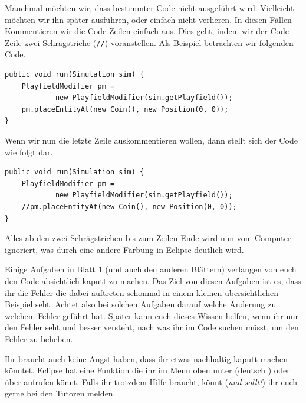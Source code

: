 \begin{Infobox}
    Manchmal möchten wir, dass bestimmter Code nicht ausgeführt wird. Vielleicht möchten wir ihn später ausführen, oder einfach nicht verlieren.
    In diesen Fällen Kommentieren wir die Code-Zeilen einfach aus.
    Dies geht, indem wir der Code-Zeile zwei Schrägstriche (\lstinline{//}) voranstellen.
    Als Beispiel betrachten wir folgenden Code.\\

    \hfill
    \begin{minipage}{.96\textwidth}
        \begin{lstlisting}
public void run(Simulation sim) {
    PlayfieldModifier pm =
            new PlayfieldModifier(sim.getPlayfield());
    pm.placeEntityAt(new Coin(), new Position(0, 0));
}
        \end{lstlisting}
    \end{minipage}

    Wenn wir nun die letzte Zeile auskommentieren wollen, dann stellt sich der Code wie folgt dar.\\

    \hfill
    \begin{minipage}{.96\textwidth}
        \begin{lstlisting}
public void run(Simulation sim) {
    PlayfieldModifier pm =
            new PlayfieldModifier(sim.getPlayfield());
    //pm.placeEntityAt(new Coin(), new Position(0, 0));
}
        \end{lstlisting}
    \end{minipage}

    Alles ab den zwei Schrägstrichen bis zum Zeilen Ende wird nun vom Computer ignoriert, was durch eine andere Färbung in Eclipse deutlich wird.
\end{Infobox}


\begin{Infobox}[Fehler]
    Einige Aufgaben in Blatt 1 (und auch den anderen Blättern) verlangen von euch den Code absichtlich kaputt zu machen.
    Das Ziel von diesen Aufgaben ist es, dass ihr die Fehler die dabei auftreten schonmal in einem kleinen übersichtlichen Beispiel seht.
    Achtet also bei solchen Aufgaben darauf welche Änderung zu welchem Fehler geführt hat.
    Später kann euch dieses Wissen helfen, wenn ihr nur den Fehler seht und besser versteht, nach was ihr im Code suchen müsst, um den Fehler zu beheben.

    Ihr braucht auch keine Angst haben, dass ihr etwas nachhaltig kaputt machen könntet.
    Eclipse hat eine  Funktion die ihr im Menu oben unter  (deutsch ) oder über  aufrufen könnt.
    Falls ihr trotzdem Hilfe braucht, könnt (\emph{und sollt!}) ihr euch gerne bei den Tutoren melden.
\end{Infobox}


